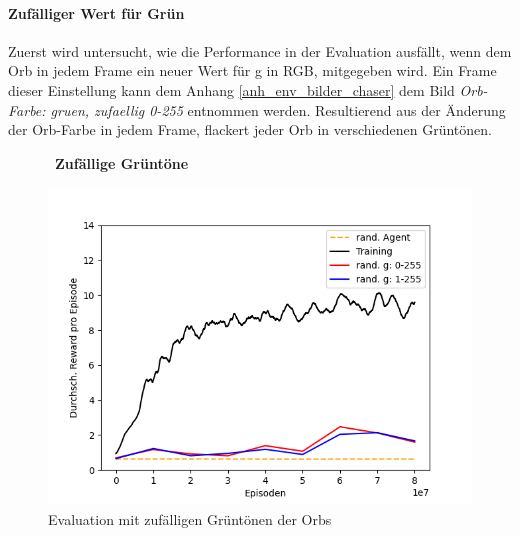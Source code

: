 \paragraph{Zufälliger Wert für Grün}\label{par:durch_EXP_farbÄnd_grünZufällig}
Zuerst wird untersucht, wie die Performance in der Evaluation ausfällt, wenn dem Orb in jedem Frame ein neuer Wert für g in RGB, mitgegeben wird. Ein Frame dieser Einstellung kann dem Anhang \ref{anh_env_bilder_chaser} dem Bild \emph{Orb-Farbe: gruen, zufaellig 0-255} entnommen werden. Resultierend aus der Änderung der Orb-Farbe in jedem Frame, flackert jeder Orb in verschiedenen Grüntönen.

\begin{figure}[htp!]
   \centering
   \captionsetup{width=0.45\linewidth} 
    \begin{minipage}{0.48\linewidth}
        \centering\
        \textbf{Zufällige Grüntöne}\par\medskip
        \includegraphics[scale=0.5]{abb/_graphen/floor_80Mio_inflvl_15act_Training_evalRandomGreens}
        \caption{Evaluation mit zufälligen Grüntönen der Orbs}
        \label{fig:floor_80Mio_inflvl_15act_Training_evalRandomGreens}
    \end{minipage}
\end{figure}

